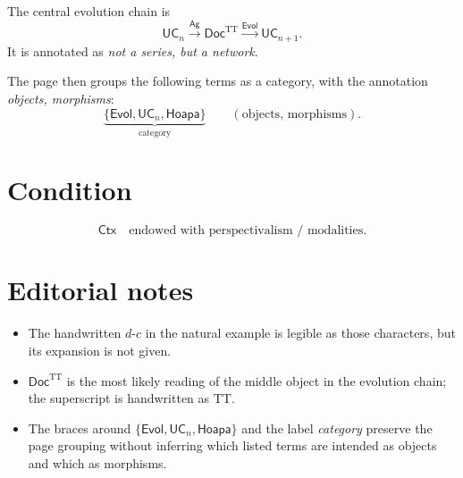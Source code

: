 \documentclass[10pt]{article}
\newcommand{\UC}{\mathsf{UC}}
\newcommand{\Ctx}{\mathsf{Ctx}}
\newcommand{\Ag}{\mathsf{Ag}}
\newcommand{\Doc}{\mathsf{Doc}}
\newcommand{\Evol}{\mathsf{Evol}}
\newcommand{\Hoapa}{\mathsf{Hoapa}}
\begin{document}
The central evolution chain is
\[
  \UC_n \xrightarrow{\Ag} \Doc^{\mathrm{TT}}
        \xrightarrow{\Evol} \UC_{n+1}.
\]
It is annotated as \emph{not a series, but a network}.

The page then groups the following terms as a category, with the annotation
\emph{objects, morphisms}:
\[
  \underbrace{\{\Evol,\UC_n,\Hoapa\}}_{\text{category}}
  \qquad
  (\text{objects, morphisms}).
\]

\section*{Condition}

\[
  \Ctx \quad \text{endowed with perspectivalism / modalities}.
\]

\section*{Editorial notes}

\begin{itemize}[leftmargin=*,itemsep=0.1em]
  \item The handwritten $d\text{-}c$ in the natural example is legible as
        those characters, but its expansion is not given.
  \item $\Doc^{\mathrm{TT}}$ is the most likely reading of the middle object
        in the evolution chain; the superscript is handwritten as
        \(\mathrm{TT}\).
  \item The braces around $\{\Evol,\UC_n,\Hoapa\}$ and the label
        \emph{category} preserve the page grouping without inferring which
        listed terms are intended as objects and which as morphisms.
\end{itemize}
\end{document}
